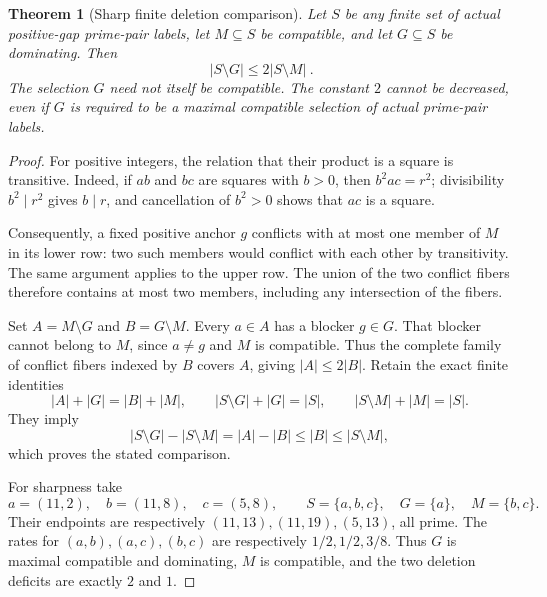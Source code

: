 \documentclass[11pt]{article}
\newtheorem{theorem}{Theorem}[section]
\begin{document}
\begin{theorem}[Sharp finite deletion comparison]
Let \(S\) be any finite set of actual positive-gap prime-pair labels,
let \(M\subseteq S\) be compatible, and let \(G\subseteq S\) be dominating.
Then
\[
 \boxed{\ |S\setminus G|\le 2|S\setminus M|\ }.
\]
The selection \(G\) need not itself be compatible. The constant \(2\)
cannot be decreased, even if \(G\) is required to be a maximal compatible
selection of actual prime-pair labels.
\end{theorem}
\begin{proof}
For positive integers, the relation that their product is a square is
transitive. Indeed, if \(ab\) and \(bc\) are squares with \(b>0\), then
\(b^2ac=r^2\); divisibility \(b^2\mid r^2\) gives \(b\mid r\), and cancellation
of \(b^2>0\) shows that \(ac\) is a square.

Consequently, a fixed positive anchor \(g\) conflicts with at most one
member of \(M\) in its lower row: two such members would conflict with each
other by transitivity. The same argument applies to the upper row. The
union of the two conflict fibers therefore contains at most two members,
including any intersection of the fibers.

Set \(A=M\setminus G\) and \(B=G\setminus M\). Every \(a\in A\) has a blocker
\(g\in G\). That blocker cannot belong to \(M\), since \(a\ne g\) and \(M\)
is compatible. Thus the complete family of conflict fibers indexed by
\(B\) covers \(A\), giving \(|A|\le2|B|\). Retain the exact finite identities
\[
 |A|+|G|=|B|+|M|,\qquad
 |S\setminus G|+|G|=|S|,\qquad
 |S\setminus M|+|M|=|S|.
\]
They imply
\[
 |S\setminus G|-|S\setminus M|
 =|A|-|B|\le |B|\le |S\setminus M|,
\]
which proves the stated comparison.

For sharpness take
\[
 a=(11,2),\quad b=(11,8),\quad c=(5,8),\qquad
 S=\{a,b,c\},\quad G=\{a\},\quad M=\{b,c\}.
\]
Their endpoints are respectively \((11,13),(11,19),(5,13)\), all prime.
The rates for \((a,b),(a,c),(b,c)\) are respectively \(1/2,1/2,3/8\).
Thus \(G\) is maximal compatible and dominating, \(M\) is compatible, and
the two deletion deficits are exactly \(2\) and \(1\).
\end{proof}
\end{document}
